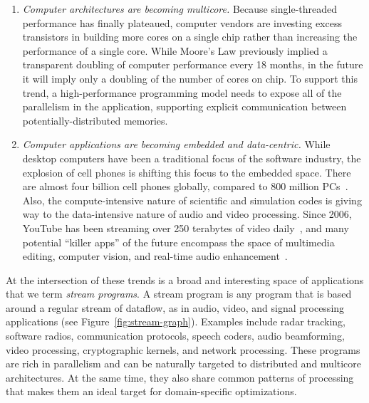 \begin{enumerate}

\item {\it Computer architectures are becoming multicore.}  Because
  single-threaded performance has finally plateaued, computer vendors
  are investing excess transistors in building more cores on a single
  chip rather than increasing the performance of a single core.  While
  Moore's Law previously implied a transparent doubling of computer
  performance every 18 months, in the future it will imply only a
  doubling of the number of cores on chip.  To support this trend, a
  high-performance programming model needs to expose all of the
  parallelism in the application, supporting explicit communication
  between potentially-distributed memories.

\item {\it Computer applications are becoming embedded and
  data-centric.}  While desktop computers have been a traditional
  focus of the software industry, the explosion of cell phones is
  shifting this focus to the embedded space.  There are almost four
  billion cell phones globally, compared to 800 million
  PCs~\cite{medford_microsoft/yahoo_2008}.  Also, the
  compute-intensive nature of scientific and simulation codes is
  giving way to the data-intensive nature of audio and video
  processing.  Since 2006, YouTube has been streaming over 250
  terabytes of video daily~\cite{watkins_mash_2006}, and many
  potential ``killer apps'' of the future encompass the space of
  multimedia editing, computer vision, and real-time audio
  enhancement~\cite{asanovic_landscape_2006,chen_convergence_2008}.

\end{enumerate}


At the intersection of these trends is a broad and interesting space
of applications that we term {\it stream programs}.  A stream program
is any program that is based around a regular stream of dataflow, as
in audio, video, and signal processing applications (see
Figure~\ref{fig:stream-graph}).  
Examples include radar tracking, software radios, communication
protocols, speech coders, audio beamforming, video processing,
cryptographic kernels, and network processing.  These programs are
rich in parallelism and can be naturally targeted to distributed and
multicore architectures.  At the same time, they also share common
patterns of processing that makes them an ideal target for
domain-specific optimizations.

